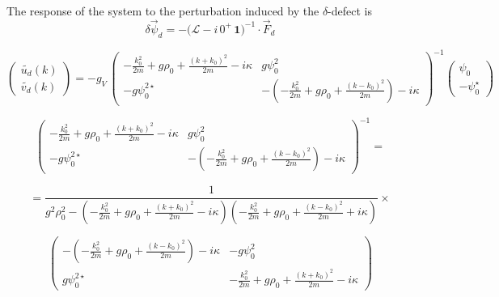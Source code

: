 \documentclass[a4paper,prb,10pt,aps]{revtex4-1}
\begin{document}
The response of the system to the perturbation induced by the $\delta$-defect is 
\begin{equation}
  \label{eq:29}
\delta\vec{\psi}_{d}=-\big(\mathcal{L}-i\,0^{+}\,\mathbf{1}\big)^{-1}\cdot\vec{F}_{d}  
\end{equation}

\begin{equation}
  \label{eq:30}
\left(\begin{array}{c}
\widetilde{u_{d}}(k)\\
\widetilde{v_{d}}(k)
\end{array}\right)=-g_{V}\,\left(\begin{array}{cc}
-\frac{k_{0}^{2}}{2m}+g\rho_{0}+\frac{(k+k_{0})^{2}}{2m}-i\kappa & g\psi_{0}^{2}\\
-g\psi_{0}^{2\star} & -\left(-\frac{k_{0}^{2}}{2m}+g\rho_{0}+\frac{(k-k_{0})^{2}}{2m}\right)-i\kappa
\end{array}\right)^{-1}\left(\begin{array}{c}
\psi_{0}\\
-\psi_{0}^{\star}
\end{array}\right)  
\end{equation}

\begin{equation}
  \label{eq:31}
\left(\begin{array}{cc}
-\frac{k_{0}^{2}}{2m}+g\rho_{0}+\frac{(k+k_{0})^{2}}{2m}-i\kappa & g\psi_{0}^{2}\\
-g\psi_{0}^{2\star} & -\left(-\frac{k_{0}^{2}}{2m}+g\rho_{0}+\frac{(k-k_{0})^{2}}{2m}\right)-i\kappa
\end{array}\right)^{-1}=  
\end{equation}

\begin{equation}
  \label{eq:32}
=\frac{1}{g^{2}\rho_{0}^{2}-\left(-\frac{k_{0}^{2}}{2m}+g\rho_{0}+\frac{(k+k_{0})^{2}}{2m}-i\kappa\right)\left(-\frac{k_{0}^{2}}{2m}+g\rho_{0}+\frac{(k-k_{0})^{2}}{2m}+i\kappa\right)}\times  
\end{equation}

\begin{equation}
  \label{eq:33}
\left(\begin{array}{cc}
-\left(-\frac{k_{0}^{2}}{2m}+g\rho_{0}+\frac{(k-k_{0})^{2}}{2m}\right)-i\kappa & -g\psi_{0}^{2}\\
g\psi_{0}^{2\star} & -\frac{k_{0}^{2}}{2m}+g\rho_{0}+\frac{(k+k_{0})^{2}}{2m}-i\kappa
\end{array}\right)  
\end{equation}
\end{document}
